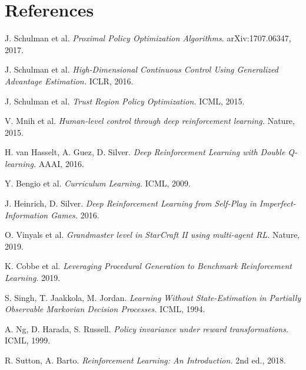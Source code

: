 \documentclass[11pt,a4paper]{article}
\begin{document}
\section*{References}
\begin{enumerate}[label={[\arabic*]},leftmargin=*]
  \item J. Schulman et al. \emph{Proximal Policy Optimization Algorithms.} arXiv:1707.06347, 2017.
  \item J. Schulman et al. \emph{High-Dimensional Continuous Control Using Generalized Advantage Estimation.} ICLR, 2016.
  \item J. Schulman et al. \emph{Trust Region Policy Optimization.} ICML, 2015.
  \item V. Mnih et al. \emph{Human-level control through deep reinforcement learning.} Nature, 2015.
  \item H. van Hasselt, A. Guez, D. Silver. \emph{Deep Reinforcement Learning with Double Q-learning.} AAAI, 2016.
  \item Y. Bengio et al. \emph{Curriculum Learning.} ICML, 2009.
  \item J. Heinrich, D. Silver. \emph{Deep Reinforcement Learning from Self-Play in Imperfect-Information Games.} 2016.
  \item O. Vinyals et al. \emph{Grandmaster level in StarCraft II using multi-agent RL.} Nature, 2019.
  \item K. Cobbe et al. \emph{Leveraging Procedural Generation to Benchmark Reinforcement Learning.} 2019.
  \item S. Singh, T. Jaakkola, M. Jordan. \emph{Learning Without State-Estimation in Partially Observable Markovian Decision Processes.} ICML, 1994.
  \item A. Ng, D. Harada, S. Russell. \emph{Policy invariance under reward transformations.} ICML, 1999.
  \item R. Sutton, A. Barto. \emph{Reinforcement Learning: An Introduction.} 2nd ed., 2018.
\end{enumerate}
\end{document}
